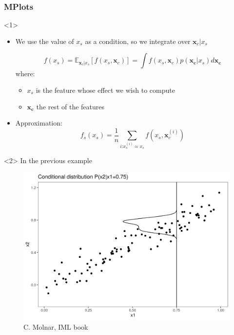 \documentclass{beamer}
\newcommand{\Vx}{\mathbf{x}}
\begin{document}
\begin{frame}
  \frametitle{MPlots}

  \begin{onlyenv}<1>
    \begin{itemize}
    \item We use the value of $x_s$ as a condition, so we integrate over \(\Vx_c|x_s\)

      \[f(x_s) = \mathbb{E}_{\Vx_c|x_s}[f(x_s, \Vx_c)] = \int f(x_s, \Vx_c) p(\bm{x_c}|x_s) d\bm{x_c} \]
      where:

      \begin{itemize}
      \item $x_s$ is the feature whose effect we wish to compute
      \item $\bm{x_c}$ the rest of the features
      \end{itemize}

    \item Approximation:
      \begin{equation*}
        f_s(x_s) = \frac{1}{n}\sum\limits_{i \text{:} x_s^{(i)} \approx x_s} f(x_s, \Vx_c^{(i)})
      \end{equation*}

    \end{itemize}
  \end{onlyenv}
  \begin{onlyenv}<2>
    In the previous example
    \begin{figure}
      \includegraphics[width=.6\textwidth]{./figures/aleplot-motivation2-1}
      \caption{\footnotesize C. Molnar, IML book}
    \end{figure}
  \end{onlyenv}
\end{frame}
\end{document}

